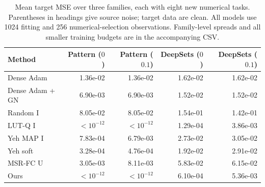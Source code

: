 \begin{table}[htbp]
\centering\small
\begin{tabular}{lrrrr}
\toprule
Method & Pattern ($0$) & Pattern ($0.1$) & DeepSets ($0$) & DeepSets ($0.1$)\\
\midrule
Dense Adam & 1.36e-02 & 1.36e-02 & 1.62e-02 & 1.62e-02\\
Dense Adam + GN & 6.90e-03 & 6.90e-03 & 1.52e-02 & 1.52e-02\\
Random I & 8.05e-02 & 8.05e-02 & 1.54e-01 & 1.42e-01\\
LUT-Q I & $<10^{-12}$ & $<10^{-12}$ & 1.29e-04 & 3.86e-03\\
Yeh MAP I & 7.83e-04 & 6.79e-03 & 2.73e-02 & 3.05e-02\\
Yeh soft & 3.28e-04 & 4.76e-04 & 1.92e-02 & 2.91e-02\\
MSR-FC U & 3.05e-03 & 8.11e-03 & 5.83e-02 & 6.15e-02\\
Ours & $<10^{-12}$ & $<10^{-12}$ & 6.10e-04 & 5.36e-03\\
\bottomrule\end{tabular}
\caption{Mean target MSE over three families, each with eight new numerical tasks. Parentheses in headings give source noise; target data are clean. All models use 1024 fitting and 256 numerical-selection observations. Family-level spreads and all smaller training budgets are in the accompanying CSV.}
\label{tab:benchmark-synthetic}
\end{table}

